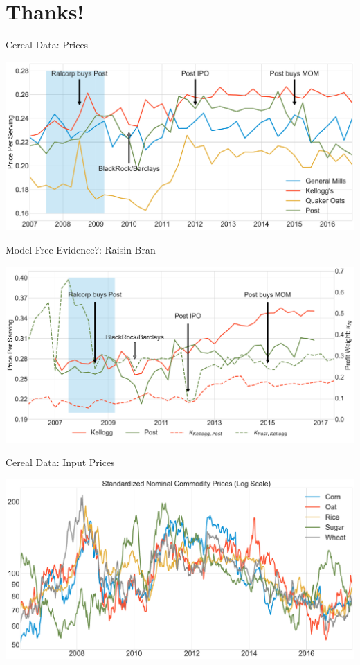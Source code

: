 \documentclass[handout, serif, aspectratio=169, 10pt]{beamer}
\begin{document}
\section{Thanks!}
\appendix

\begin{frame}[plain]{Cereal Data: Prices}
\begin{center}
\includegraphics[height = 0.9\textheight ]{figures/firm_prices.pdf}
\end{center}
\end{frame}


\begin{frame}{Model Free Evidence?: Raisin Bran}
\begin{center}
\includegraphics[height = 0.9\textheight ]{figures/raisin_bran.pdf}
\end{center}
\end{frame}


\begin{frame}[plain]{Cereal Data: Input Prices}
\begin{center}
\includegraphics[height = 0.9\textheight ]{figures/input-prices.pdf}
\end{center}
\end{frame}
\end{document}
